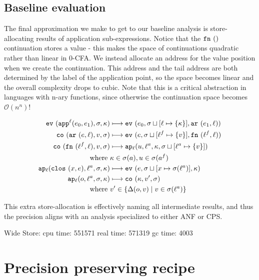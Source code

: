 \documentclass[preprint,onecolumn,9pt]{sigplanconf} %
\begin{document}
\subsection{Baseline evaluation}

The final approximation we make to get to our baseline analysis is
store-allocating results of application sub-expressions. Notice that
the $\kfn{}$ continuation stores a value - this makes the space of
continuations quadratic rather than linear in 0-CFA. We instead
allocate an address for the value position when we create the
continuation. This address and the tail address are both determined by
the label of the application point, so the space becomes linear and
the overall complexity drops to cubic. Note that this is a critical
abstraction in languages with n-ary functions, since otherwise the
continuation space becomes ${\mathcal O}(n^n)$!

\begin{align*}
\ev{\sapp[^\mlab]{\mexpi0}{\mexpi1},\msto,\mkont} &\machstep
\ev{\mexpi{0},\msto\sqcup[\mlab \mapsto \{\mkont\}],\kar{\mexpi{1},\mlab}}
\\
\co{\kar{\mexp,\mlab},\mval,\msto} & \machstep
\ev{\mexp,\msto\sqcup[\mlab^f \mapsto \{\mval\}],\kfn{\mlab^f,\mlab}}
\\
\co{\kfn{\mlab^f,\mlab},\mval,\msto} & \machstep
\ap[_\mlab]{\mvalx{u},\mlab^a,\mkont,\msto\sqcup[\mlab^a \mapsto \{\mval\}]}
\\
\text{ where } &\mkont \in \msto(\maddr), \mvalx{u} \in \msto(\maddr^f)
\\
\ap[_\mlab]{\clos{\mvar,\mexp},\mlab^a, \msto,\mkont} & \machstep
\ev{\mexp,\msto\sqcup[\mvar \mapsto \msto(\mlab^a)],\mkont}
\\
\ap[_\mlab]{\mop,\mlab^a,\msto,\mkont} & \machstep
\co{\mkont,\mval',\msto}
\\
\text{ where }& \mval'\in \{\interpdelta(\mop,\mval) \mid \mval \in \msto(\mlab^a)\}
\end{align*}

This extra store-allocation is effectively naming all intermediate
results, and thus the precision aligns with an analysis specialized to
either ANF or CPS. 

Wide Store: cpu time: 551571 real time: 571319 gc time: 4003

\section{Precision preserving recipe}
\end{document}
